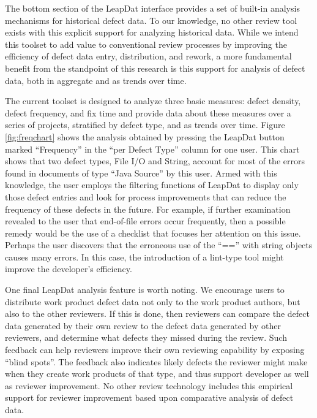 \begin{figure*}[t]
{\centerline {}}
 \caption{{\em A defect data analysis, showing defect frequencies for
                one document type (Java Source), categorized by defect
                type. Two defect types, File I/O and String, account for
                the vast majority of this user's defects.}}
 \label{fig:freqchart}
\end{figure*}

The bottom section of the LeapDat interface provides a set of built-in
analysis mechanisms for historical defect data. To our knowledge, no other
review tool exists with this explicit support for analyzing historical
data.  While we intend this toolset to add value to conventional review
processes by improving the efficiency of defect data entry, distribution,
and rework, a more fundamental benefit from the standpoint of this research
is this support for analysis of defect data, both in aggregate and as
trends over time.

The current toolset is designed to analyze three basic measures:
defect density, defect frequency, and fix time and provide data about these
measures over a series of projects, stratified by defect type, and as
trends over time.  Figure \ref{fig:freqchart} shows the analysis obtained
by pressing the LeapDat button marked ``Frequency'' in the ``per Defect
Type'' column for one user.  This chart shows that two defect types, File
I/O and String, account for most of the errors found in documents of type
``Java Source'' by this user.  Armed with this knowledge, the user employs the
filtering functions of LeapDat to display only those defect entries and
look for process improvements that can reduce the frequency of these
defects in the future. For example, if further examination revealed to the
user that end-of-file errors occur frequently, then a possible remedy would
be the use of a checklist that focuses her attention on this issue.
Perhaps the user discovers that the erroneous use of the ``=='' with string
objects causes many errors. In this case, the introduction of a lint-type
tool might improve the developer's efficiency.

One final LeapDat analysis feature is worth noting. We encourage users to
distribute work product defect data not only to the work product authors,
but also to the other reviewers.  If this is done, then reviewers can
compare the defect data generated by their own review to the defect data
generated by other reviewers, and determine what defects they missed during
the review. Such feedback can help reviewers improve their own reviewing
capability by exposing ``blind spots''. The feedback also indicates likely
defects the reviewer might make when they create work products of that
type, and thus support developer as well as reviewer improvement.  No other
review technology includes this empirical support for reviewer improvement
based upon comparative analysis of defect data. 

